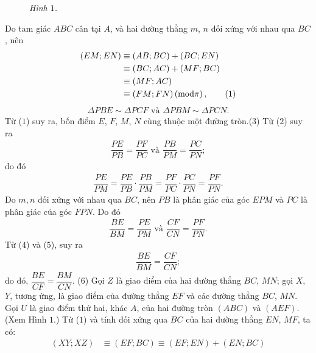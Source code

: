 \begin{multicols}{2}
\begin{figure}[H]
		\vspace*{-10pt}
		\caption{\small\textit{\color{thachthuctoanhoc}Hình $1$.}}
		\vspace*{-15pt}
	\end{figure}
	Do tam giác $ABC$ cân tại $A$, và hai đường thẳng $m$, $n$ đối xứng với nhau qua $BC$, nên 
	\begin{align*}
		\left( {EM;EN} \right) &\equiv \left( {AB;BC} \right) + \left( {BC;EN} \right) \\
		&\equiv \left( {BC;AC} \right) + \left( {MF;BC} \right)\\
		&\equiv \left( {MF;AC} \right) \\
		&\equiv \left( {FM;FN} \right)\left( {{\rm{mod}}\pi } \right), \tag{$1$}
	\end{align*}
	\begin{align*}
		\Delta PBE \sim \Delta PCF \text{ và } \Delta PBM \sim \Delta PCN. \tag{$2$}
	\end{align*}
	Từ ($1$) suy ra, bốn điểm $E$, $F$, $M$, $N$ cùng thuộc một đường tròn.\hfill ($3$)
	\vskip 0.05cm
	Từ ($2$) suy ra
	\begin{align*}
		\dfrac{{PE}}{{PB}} = \dfrac{{PF}}{{PC}} \text{ và } \dfrac{{PB}}{{PM}} = \dfrac{{PC}}{{PN}};
	\end{align*}
	do đó
	\begin{align*}
		\dfrac{{PE}}{{PM}} = \dfrac{{PE}}{{PB}} \cdot \dfrac{{PB}}{{PM}} = \dfrac{{PF}}{{PC}} \cdot \dfrac{{PC}}{{PN}} = \dfrac{{PF}}{{PN}}. \tag{$4$}
	\end{align*}
	Do $m, n$ đối xứng với nhau qua $BC$, nên $PB$ là phân giác của góc $EPM$ và $PC$ là phân giác của góc $FPN$. Do đó
	\begin{align*}
		\dfrac{{BE}}{{BM}} = \dfrac{{PE}}{{PM}} \text{ và } \dfrac{{CF}}{{CN}} = \dfrac{{PF}}{{PN}}. \tag{$5$}
	\end{align*}
	Từ ($4$) và ($5$), suy ra
	\begin{align*}
		\dfrac{{BE}}{{BM}} = \dfrac{{CF}}{{CN}};
	\end{align*}
	do đó, $\dfrac{{BE}}{{CF}} = \dfrac{{BM}}{{CN}}$. \hfill ($6$)
	\vskip 0.05cm
	Gọi $Z$ là giao điểm của hai đường thẳng $BC$, $MN$; gọi $X$, $Y$, tương ứng, là giao điểm của đường thẳng $EF$ và các đường thẳng $BC$, $MN$. Gọi $U$ là giao điểm thứ hai, khác $A$, của hai đường tròn $(ABC)$ và $(AEF)$. (Xem Hình $1$.)
	\vskip 0.05cm
	Từ ($1$) và tính đối xứng qua $BC$ của hai đường thẳng $EN$, $MF$, ta có:
	\begin{align*}
			\left( {XY\!;\!XZ} \right) &\!\equiv \!\left( {EF\!;\!BC} \right) \!\equiv\! \left( {EF\!;\!EN} \right) \!+\! \left( {EN\!;\!BC} \right)\\[-0.5ex]

\end{align*}
\end{multicols}
